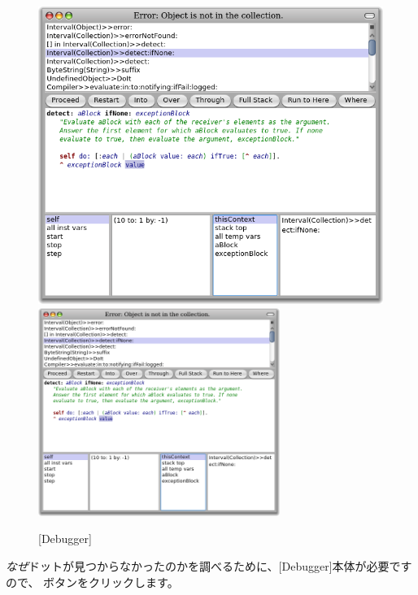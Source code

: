 \documentclass[a4paper,10pt,twoside]{book}
\begin{document}
\begin{figure}[btp]
	\begin{center}
	\ifluluelse
		{\includegraphics[width=\textwidth]{debuggerDetectIfNone}}
		{\includegraphics[width=0.7\textwidth]{debuggerDetectIfNone}}
	\end{center}
	\caption{[Debugger]}
\end{figure}

\emph{なぜ}ドットが見つからなかったのかを調べるために、[Debugger]本体が必要ですので、 ボタンをクリックします。

\end{document}
